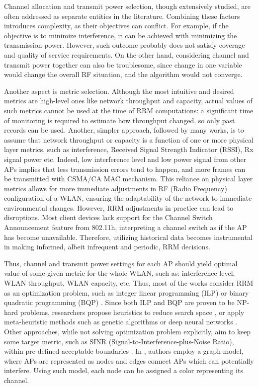Channel allocation and transmit power selection, though extensively studied, are often addressed as separate entities in the literature. Combining these factors introduces complexity, as their objectives can conflict. For example, if the objective is to minimize interference, it can be achieved with minimizing the transmission power. However, such outcome probably does not satisfy coverage and quality of service requirements. On the other hand, considering channel and transmit power together can also be troublesome, since change in one variable would change the overall RF situation, and the algorithm would not converge.

Another aspect is metric selection. Although the most intuitive and desired metrics are high-level ones like network throughput and capacity, actual values of such metrics cannot be used at the time of RRM computations: a significant time of monitoring is required to estimate how throughput changed, so only past records can be used. Another, simpler approach, followed by many works, is to assume that network throughput or capacity is a function of one or more physical layer metrics, such as interference, Received Signal Strength Indicator (RSSI), Rx signal power etc. Indeed, low interference level and low power signal from other APs implies that less transmission errors tend to happen, and more frames can be transmitted with CSMA/CA MAC mechanism.
This reliance on physical layer metrics allows for more immediate adjustments in RF (Radio Frequency) configuration of a WLAN, ensuring the adaptability of the network to immediate environmental changes.
However, RRM adjustments in practice can lead to disruptions. Most client devices lack support for the Channel Switch Announcement feature from 802.11h, interpreting a channel switch as if the AP has become unavailable. Therefore, utilizing historical data becomes instrumental in making informed, albeit infrequent and periodic, RRM decisions.

Thus, channel and transmit power settings for each AP should yield optimal value of some given metric for the whole WLAN, such as: interference level, WLAN throughput, WLAN capacity, etc. Thus, most of the works consider RRM as an optimization problem, such as integer linear programming (ILP) \cite{leeOptimizationAPPlacement2002} \cite{rodriguesDesignCapacityPlanning2000} or binary quadratic programming (BQP) \cite{leeDeepLearningAidedChannel2023}.
Since both ILP and BQP are proven to be NP-hard problems, researchers propose heuristics to reduce search space \cite{levantiCAPWAPCompliantSolutionRadio2007}, or apply meta-heuristic methods such as genetic algorithms \cite{raschellaEvaluationChannelAssignment2019} or deep neural networks \cite{leeDeepLearningAidedChannel2023}. Other approaches, while not solving optimization problem explicitly, aim to keep some target metric, such as SINR (Signal-to-Interference-plus-Noise Ratio), within pre-defined acceptable boundaries \cite{michalskiSimplePerformanceboostingAlgorithm2016}.
In \cite{aruneshmishraWeightedColoringBased2005}, authors employ a graph model, where APs are represented as nodes and edges connect APs which can potentially interfere. Using such model, each node can be assigned a color representing its channel.

